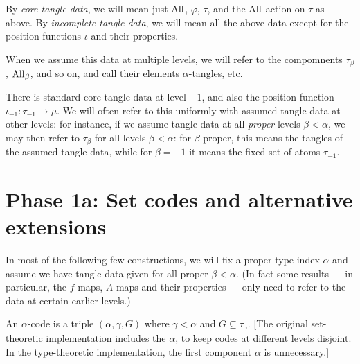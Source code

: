 \begin{definition}
  By \emph{core tangle data}, we will mean just $\mathrm{All}$, $\varphi$, $\tau$, and the $\mathrm{All}$-action on $\tau$ as above.  By \emph{incomplete tangle data}, we will mean all the above data except for the position functions $\iota$ and their properties.

  When we assume this data at multiple levels, we will refer to the compomnents $\tau_\beta$, $\mathrm{All}_\beta$, and so on, and call their elements $\alpha$-tangles, etc.
\end{definition}

There is standard core tangle data at level $-1$, and also the position function $\iota_{-1} : \tau_{-1} \to \mu$.  We will often refer to this uniformly with assumed tangle data at other levels: for instance, if we assume tangle data at all \emph{proper} levels $\beta < \alpha$, we may then refer to $\tau_\beta$ for all levels $\beta < \alpha$: for $\beta$ proper, this means the tangles of the assumed tangle data, while for $\beta = -1$ it means the fixed set of atoms $\tau_{-1}$.

\section{Phase 1a: Set codes and alternative extensions}

In most of the following few constructions, we will fix a proper type index $\alpha$ and assume we have tangle data given for all proper $\beta < \alpha$. (In fact some results --- in particular, the $f$-maps, $A$-maps and their properties --- only need to refer to the data at certain earlier levels.)

\begin{definition}
\label {def:code}
\leanok
An $\alpha$-code is a triple $(\alpha,\gamma,G)$ where $\gamma<\alpha$ and $G \subseteq \tau_\gamma$. [The original set-theoretic implementation includes the $\alpha$, to keep codes at different levels disjoint.  In the type-theoretic implementation, the first component $\alpha$ is unnecessary.]
\end{definition}

